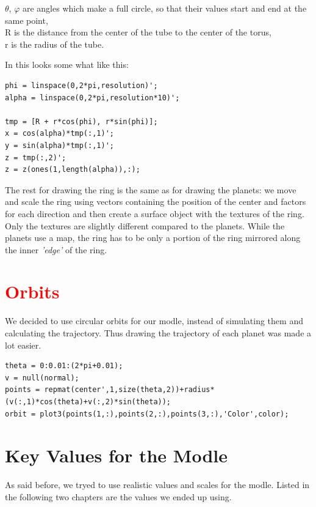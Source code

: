 $\theta$, $\varphi$ are angles which make a full circle, so that their values start and end at the same point,\\
R is the distance from the center of the tube to the center of the torus,\\
r is the radius of the tube.

In \matlab{} this looks some what like this:
\begin{framed}\begin{verbatim}
phi = linspace(0,2*pi,resolution)';
alpha = linspace(0,2*pi,resolution*10)';

tmp = [R + r*cos(phi), r*sin(phi)];
x = cos(alpha)*tmp(:,1)';
y = sin(alpha)*tmp(:,1)';
z = tmp(:,2)';
z = z(ones(1,length(alpha)),:);
\end{verbatim}\end{framed}
The rest for drawing the ring is the same as for drawing the planets: we move and scale the ring using vectors containing the position of the center and factors for each direction and then create a surface object with the textures of the ring. Only the textures are slightly different compared to the planets. While the planets use a map, the ring has to be only a portion of the ring mirrored along the inner {\em 'edge'} of the ring.


\section{\textcolor{red}{Orbits}}
We decided to use circular orbits for our modle, instead of simulating them and calculating the trajectory. Thus drawing the trajectory of each planet was made a lot easier. 

\begin{framed}\begin{verbatim}
theta = 0:0.01:(2*pi+0.01);
v = null(normal);
points = repmat(center',1,size(theta,2))+radius*(v(:,1)*cos(theta)+v(:,2)*sin(theta));
orbit = plot3(points(1,:),points(2,:),points(3,:),'Color',color);
\end{verbatim}\end{framed}

\pagebreak
\section{Key Values for the Modle}
As said before, we tryed to use realistic values and scales for the modle. Listed in the following two chapters are the values we ended up using.

